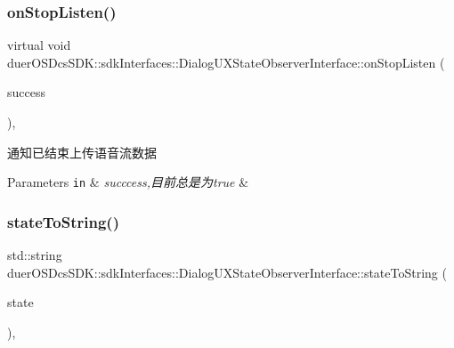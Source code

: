 \subsubsection{\texorpdfstring{on\+Stop\+Listen()}{onStopListen()}}
{\footnotesize\ttfamily virtual void duer\+O\+S\+Dcs\+S\+D\+K\+::sdk\+Interfaces\+::\+Dialog\+U\+X\+State\+Observer\+Interface\+::on\+Stop\+Listen (\begin{DoxyParamCaption}\item[{bool}]{success }\end{DoxyParamCaption})\hspace{0.3cm}{\ttfamily [inline]}, {\ttfamily [virtual]}}



通知已结束上传语音流数据 


\begin{DoxyParams}[1]{Parameters}
\mbox{\tt in}  & {\em succcess,目前总是为true} & \\
\hline
\end{DoxyParams}
\mbox{\label{classduerOSDcsSDK_1_1sdkInterfaces_1_1DialogUXStateObserverInterface_a92870093ce3de85233e4e7b098c94185}} 
\subsubsection{\texorpdfstring{state\+To\+String()}{stateToString()}\hspace{0.1cm}{\footnotesize\ttfamily [1/2]}}
{\footnotesize\ttfamily std\+::string duer\+O\+S\+Dcs\+S\+D\+K\+::sdk\+Interfaces\+::\+Dialog\+U\+X\+State\+Observer\+Interface\+::state\+To\+String (\begin{DoxyParamCaption}\item[{\hyperlink{classduerOSDcsSDK_1_1sdkInterfaces_1_1DialogUXStateObserverInterface_abbcd31d45f9112289ba73c574bf191cd}{Dialog\+U\+X\+State}}]{state }\end{DoxyParamCaption})\hspace{0.3cm}{\ttfamily [inline]}, {\ttfamily [static]}}



